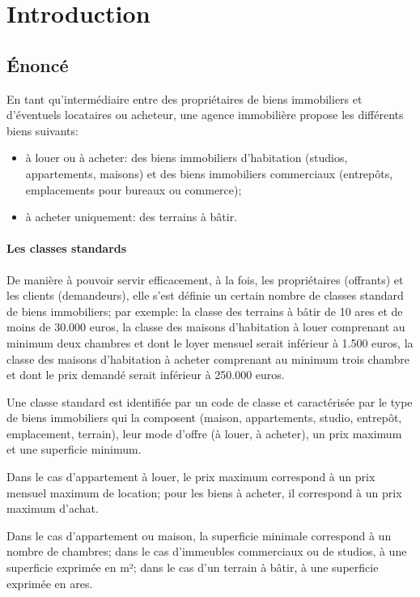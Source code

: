 \chapter{Introduction}

\section{Énoncé}

En tant qu'intermédiaire entre des propriétaires de biens immobiliers et d'éventuels locataires ou acheteur, une agence immobilière propose les différents biens suivants:
\begin{itemize}
  \item à louer ou à acheter: des biens immobiliers d'habitation (studios, appartements, maisons) et des biens immobiliers commerciaux (entrepôts, emplacements pour bureaux ou commerce);
  \item à acheter uniquement: des terrains à bâtir.
\end{itemize}

\subsubsection{Les classes standards}

De manière à pouvoir servir efficacement, à la fois, les propriétaires (offrants) et les clients (demandeurs), elle s'est définie un certain nombre de \og{}classes standard\fg{} de biens immobiliers; par exemple: la classe des terrains à bâtir de 10 ares et de moins de 30.000 euros, la classe des maisons d'habitation à louer comprenant au minimum deux chambres et dont le loyer mensuel serait inférieur à 1.500 euros, la classe des maisons d'habitation à acheter comprenant au minimum trois chambre et dont le prix demandé serait inférieur à 250.000 euros.

Une classe standard est identifiée par un code de classe et caractérisée par le type de biens immobiliers qui la composent (maison, appartements, studio, entrepôt, emplacement, terrain), leur mode d'offre (à louer, à acheter), un prix maximum et une superficie minimum.

Dans le cas d'appartement à louer, le prix maximum correspond à un prix mensuel maximum de location; pour les biens à acheter, il correspond à un prix maximum d'achat.

Dans le cas d'appartement ou maison, la superficie minimale correspond à un nombre de chambres; dans le cas d'immeubles commerciaux ou de studios, à une superficie exprimée en m²; dans le cas d'un terrain à bâtir, à une superficie exprimée en ares.

